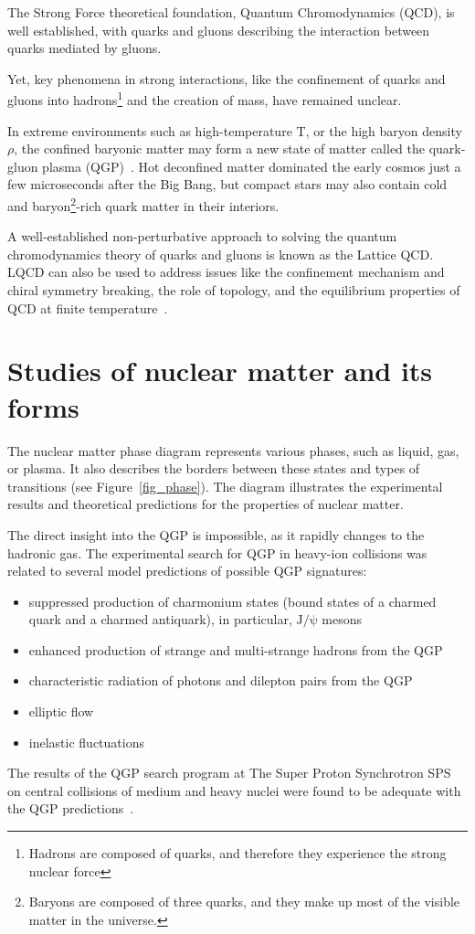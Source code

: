 \newpage

The Strong Force theoretical foundation, Quantum Chromodynamics (QCD), is well established, with quarks and gluons describing the interaction between quarks mediated by gluons.

Yet, key phenomena in strong interactions, like the confinement of quarks and gluons into hadrons\footnote{Hadrons are composed of quarks, and therefore they experience the strong nuclear force} and the creation of mass, have remained unclear.

In extreme environments such as high-temperature T, or the high baryon density $\rho$, the confined baryonic matter may form a new state of matter called the quark-gluon plasma (\gls{QGP})~\cite{phase_diagram}. Hot deconfined matter dominated the early cosmos just a few microseconds after the Big Bang, but compact stars may also contain cold and baryon\footnote{Baryons are composed of three quarks, and they make up most of the visible matter in the universe.}-rich quark matter in their interiors.

A well-established non-perturbative approach to solving the quantum chromodynamics theory of quarks and gluons is known as the Lattice \gls{QCD}. LQCD can also be used to address issues like the confinement mechanism and chiral symmetry breaking, the role of topology, and the equilibrium properties of \gls{QCD} at finite temperature~\cite{lattice_qcd}. 

\section{Studies of nuclear matter and its forms}
 The nuclear matter phase diagram represents various phases, such as liquid, gas, or plasma. It also describes the borders between these states and types of transitions (see Figure~\ref{fig_phase}). The diagram illustrates the experimental results and theoretical predictions for the properties of nuclear matter.

The direct insight into the \gls{QGP} is impossible, as it rapidly changes to the hadronic gas. The experimental search for \gls{QGP} in heavy-ion collisions was related to several model predictions of possible \gls{QGP} signatures: 
\begin{itemize}
    \item suppressed production of charmonium states (bound states of a charmed quark and a charmed antiquark), in particular, $\mathrm{J/\psi}$ mesons \cite{MATSUI1986416}
    \item enhanced production of strange and multi-strange hadrons from the \gls{QGP} \cite{strageness}
    \item characteristic radiation of photons and dilepton pairs from the \gls{QGP}
    \item elliptic flow \cite{Stefaniak:2022dxo}
    \item inelastic fluctuations \cite{Stefaniak:2022dxo}
\end{itemize}
The results of the QGP search program at The Super Proton Synchrotron \gls{SPS} on central collisions of medium and heavy nuclei were found to be adequate with the QGP predictions~\cite{Rafelski_2015}.

